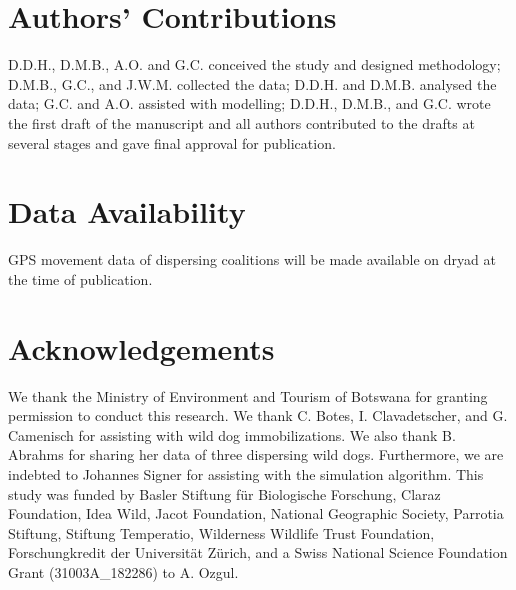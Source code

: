 \documentclass[abstract=on,10pt,a4paper,bibliography=totocnumbered]{article}
\begin{document}
\section{Authors' Contributions}
D.D.H., D.M.B., A.O. and G.C. conceived the study and designed methodology;
D.M.B., G.C., and J.W.M. collected the data; D.D.H. and D.M.B. analysed the
data; G.C. and A.O. assisted with modelling; D.D.H., D.M.B., and G.C. wrote the
first draft of the manuscript and all authors contributed to the drafts at
several stages and gave final approval for publication.

\section{Data Availability}
GPS movement data of dispersing coalitions will be made available on dryad at
the time of publication.

\section{Acknowledgements}
We thank the Ministry of Environment and Tourism of Botswana for granting
permission to conduct this research. We thank C. Botes, I. Clavadetscher, and G.
Camenisch for assisting with wild dog immobilizations. We also thank B. Abrahms
for sharing her data of three dispersing wild dogs. Furthermore, we are indebted
to Johannes Signer for assisting with the simulation algorithm. This study was
funded by Basler Stiftung für Biologische Forschung, Claraz Foundation, Idea
Wild, Jacot Foundation, National Geographic Society, Parrotia Stiftung, Stiftung
Temperatio, Wilderness Wildlife Trust Foundation, Forschungkredit der
Universität Zürich, and a Swiss National Science Foundation Grant
(31003A\_182286) to A. Ozgul.

\newpage
\begingroup
\singlespacing

\endgroup
\end{document}
